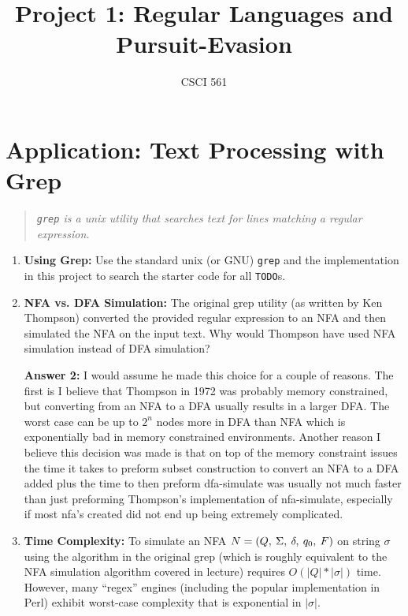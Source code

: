 \documentclass[12pt,letterpaper]{ntdhw}
\title{Project 1: Regular Languages and Pursuit-Evasion}
\author{CSCI 561}
\begin{document}
\pagestyle{fancyplain}

\maketitle
\thispagestyle{fancyplain}



\section*{Application: Text Processing with Grep}

\begin{quote}
  \emph{\texttt{grep} is a unix utility that searches text for lines
    matching a regular expression.}
\end{quote}

\begin{enumerate}
  \item \textbf{Using Grep:} Use the standard unix (or GNU)
  \texttt{grep} and the implementation in this project to search the
  starter code for all \texttt{TODO}s.

  \item \textbf{NFA vs. DFA Simulation:} The original grep utility (as
  written by Ken Thompson) converted the provided regular expression
  to an NFA and then simulated the NFA on the input text.  Why would
  Thompson have used NFA simulation instead of DFA simulation?
  \par \textbf{Answer 2:} I would assume he made this choice for a couple of reasons. The first is I believe that Thompson in 1972 was probably memory constrained, but converting from an NFA to a DFA usually results in a larger DFA. The worst case can be up to $2^n$ nodes more in DFA than NFA  which is exponentially bad in memory constrained environments. Another reason I believe this decision was made is that on top of the memory constraint issues the time it takes to preform subset construction to convert an NFA to a DFA added plus the time to then preform dfa-simulate was usually not much faster than just preforming Thompson's implementation of  nfa-simulate, especially if most nfa's created did not end up being extremely complicated. 

  \item \textbf{Time Complexity:} To simulate an NFA
  $N=\lmtuple{Q}{\Sigma}{\delta}{q_0}{F}$ on string $\sigma$ using the
  algorithm in the original grep (which is roughly equivalent to the
  NFA simulation algorithm covered in lecture) requires
  $O(|Q|*|\sigma|)$ time. However, many ``regex'' engines (including the
  popular implementation in Perl) exhibit worst-case complexity that
  is exponential in $|\sigma|$.


\end{enumerate}
\end{document}
